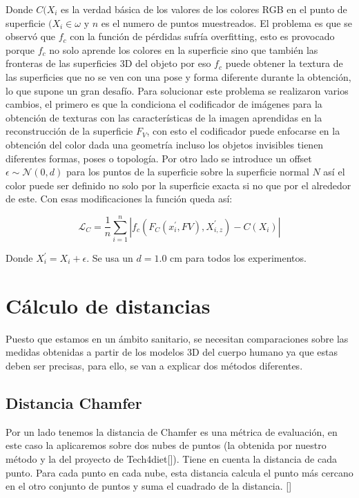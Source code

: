 Donde $C(X_{i}$ es la verdad básica de los valores de los colores RGB en el punto de superficie $(X_{i} \in \omega$ y $n$ es el numero de puntos muestreados. El problema es que se observó que $f_{c}$ con la función de pérdidas sufría overfitting, esto es provocado porque $f_{c}$ no solo aprende los colores en la superficie sino que también las fronteras de las superficies 3D del objeto por eso $f_{c}$ puede obtener la textura de las  superficies que no se ven con una pose y forma diferente durante la obtención, lo que supone un gran desafío. Para solucionar este problema se realizaron varios cambios, el primero es que la condiciona el codificador de imágenes para la obtención de texturas con las características de la imagen aprendidas en la reconstrucción de la superficie $F_{V}$, con esto el codificador puede enfocarse en la obtención del color dada una geometría incluso los objetos invisibles tienen diferentes formas, poses o topología. Por otro lado se introduce un offset $\epsilon \sim \mathcal{N}(0, d)$ para los puntos de la superficie sobre la superficie normal $N$ así el color puede ser definido no solo por la superficie exacta si no que por el alrededor de este. Con esas modificaciones la función queda así:

\begin{equation}
	\label{eq:5}
	\mathcal{L}_{C} = \frac{1}{n} 
	\sum_{i=1}^{n} | f_{c} (F_{C}(x_{i}^{'}, F{V}), X_{i,z}^{'}) - C(X_{i}) |
\end{equation}

Donde $ X_{i}^{'} = X_{i} + \epsilon$. Se usa un $d = 1.0$ cm para todos los experimentos.

\section{Cálculo de distancias}

Puesto que estamos en un ámbito sanitario, se necesitan comparaciones sobre las medidas obtenidas a partir de los modelos 3D del cuerpo humano ya que estas deben ser precisas, para ello, se van a explicar dos métodos diferentes. 

\subsection{Distancia Chamfer}
Por un lado tenemos la distancia de Chamfer es una métrica de evaluación, en este caso la aplicaremos sobre dos nubes de puntos (la obtenida por nuestro método y la del proyecto de Tech4diet[\cite{tech}]). Tiene en cuenta la distancia de cada punto. Para cada punto en cada nube, esta distancia calcula el punto más cercano en el otro conjunto de puntos y suma el cuadrado de la distancia. [\cite{linyi_2022}]

